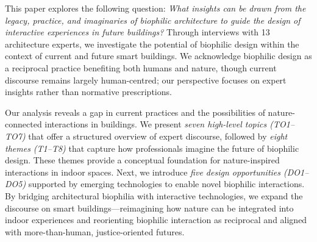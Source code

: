 This paper explores the following question: \textit{What insights can be drawn from the legacy, practice, and imaginaries of biophilic architecture to guide the design of interactive experiences in future buildings?} Through interviews with 13 architecture experts, we investigate the potential of biophilic design within the context of current and future smart buildings. We acknowledge biophilic design as a reciprocal practice benefiting both humans and nature, though current discourse remains largely human-centred; our perspective focuses on expert insights rather than normative prescriptions.

Our analysis reveals a gap in current practices and the possibilities of nature-connected interactions in buildings. We present \emph{seven high-level topics (TO1–TO7)} that offer a structured overview of expert discourse, followed by \emph{eight themes (T1–T8)} that capture how professionals imagine the future of biophilic design. These themes provide a conceptual foundation for nature-inspired interactions in indoor spaces. Next, we introduce \emph{five design opportunities (DO1–DO5)} supported by emerging technologies to enable novel biophilic interactions. By bridging architectural biophilia with interactive technologies, we expand the discourse on smart buildings---reimagining how nature can be integrated into indoor experiences and reorienting biophilic interaction as reciprocal and aligned with more-than-human, justice-oriented futures.

